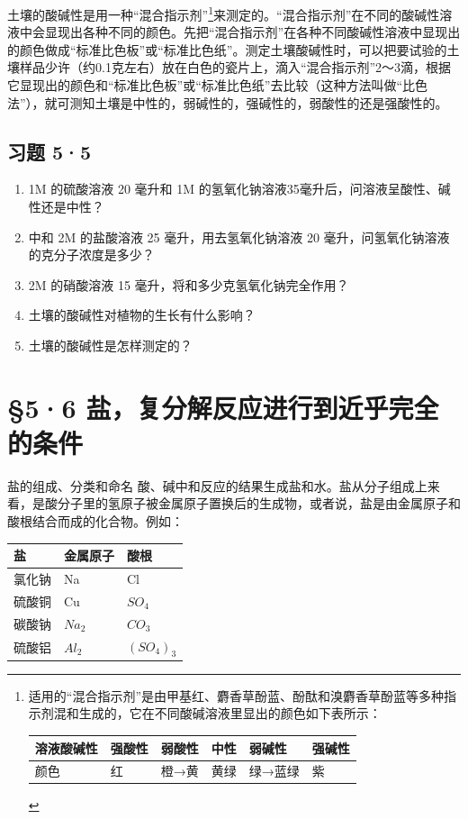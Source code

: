 土壤的酸碱性是用一种``混合指示剂''\footnote{适用的``混合指示剂''是由甲基红、麝香草酚蓝、酚酞和溴麝香草酚蓝等多种指示剂混和生成的，它在不同酸碱溶液里显出的颜色如下表所示：

  {\def\LTcaptype{none} %
  \begin{longtable}[]{@{}llllll@{}}
  \toprule\noalign{}
  溶液酸碱性 & 强酸性 & 弱酸性 & 中性 & 弱碱性 & 强碱性 \\
  \midrule\noalign{}
  \endhead
  \bottomrule\noalign{}
  \endlastfoot
  颜色 & 红 & 橙→黄 & 黄绿 & 绿→蓝绿 & 紫 \\
  \end{longtable}
  }}来测定的。``混合指示剂''在不同的酸碱性溶液中会显现出各种不同的颜色。先把``混合指示剂''在各种不同酸碱性溶液中显现出的颜色做成``标准比色板''或``标准比色纸''。测定土壤酸碱性时，可以把要试验的土壤样品少许（约0.1克左右）放在白色的瓷片上，滴入``混合指示剂''2～3滴，根据它显现出的颜色和``标准比色板''或``标准比色纸''去比较（这种方法叫做``比色法''），就可测知土壤是中性的，弱碱性的，强碱性的，弱酸性的还是强酸性的。

\subsection{习题 5·5}

\begin{enumerate}
\item
  1M 的硫酸溶液 20 毫升和 1M
  的氢氧化钠溶液35毫升后，问溶液呈酸性、碱性还是中性？
\item
  中和 2M 的盐酸溶液 25 毫升，用去氢氧化钠溶液 20
  毫升，问氢氧化钠溶液的克分子浓度是多少？
\item
  2M 的硝酸溶液 15 毫升，将和多少克氢氧化钠完全作用？
\item
  土壤的酸碱性对植物的生长有什么影响？
\item
  土壤的酸碱性是怎样测定的？
\end{enumerate}

\section{§5·6 盐，复分解反应进行到近乎完全的条件}

盐的组成、分类和命名
酸、碱中和反应的结果生成盐和水。盐从分子组成上来看，是酸分子里的氢原子被金属原子置换后的生成物，或者说，盐是由金属原子和酸根结合而成的化合物。例如：

{\def\LTcaptype{none} %
\begin{longtable}[]{@{}lll@{}}
\toprule\noalign{}
盐 & 金属原子 & 酸根 \\
\midrule\noalign{}
\endhead
\bottomrule\noalign{}
\endlastfoot
氯化钠 & Na & Cl \\
硫酸铜 & Cu & \(SO_4\) \\
碳酸钠 & \(Na_2\) & \(CO_3\) \\
硫酸铝 & \(Al_2\) & \((SO_4)_3\) \\
\end{longtable}
}

